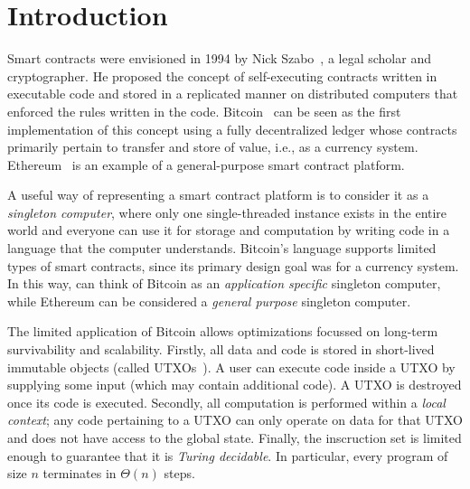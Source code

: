 \documentclass[runningheads]{llncs}
\begin{document}
\section{Introduction}

Smart contracts were envisioned in 1994 by Nick Szabo~\cite{szabo1997idea}, a legal scholar and cryptographer. He proposed the concept of self-executing contracts written in executable code and stored in a replicated manner on distributed computers that enforced the rules written in the code. 
Bitcoin~\cite{Nak08} can be seen as the first implementation of this concept using a fully decentralized ledger whose contracts primarily pertain to transfer and store of value, i.e., as a currency system. 
Ethereum~\cite{wood2014ethereum} is an example of a general-purpose smart contract platform. 

A useful way of representing a smart contract platform is to consider it as a {\em singleton computer}, where only one single-threaded instance exists in the entire world and everyone can use it for storage and computation by writing code in a language that the computer understands.
Bitcoin's language supports limited types of smart contracts, since its primary design goal was for a currency system. In this way, can think of Bitcoin as an {\em application specific} singleton computer, while Ethereum can be considered a {\em general purpose} singleton computer.

The limited application of Bitcoin allows optimizations focussed on long-term survivability and scalability. Firstly, all data and code is stored in short-lived immutable objects (called UTXOs~\cite{utxo}). A user can execute code inside a UTXO by supplying some input (which may contain additional code). A UTXO is destroyed once its code is executed. Secondly, all computation is performed within a {\em local context}; any code pertaining to a UTXO can only operate on data for that UTXO and does not have access to the global state. Finally, the inscruction set is limited enough to guarantee that it is {\em Turing decidable}. In particular, every program of size $n$ terminates in $\Theta(n)$ steps. 

\end{document}
